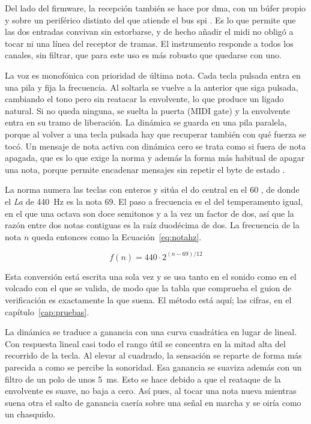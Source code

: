 Del lado del firmware, la recepción también se hace por \gls{dma}, con un búfer
propio y sobre un periférico distinto del que atiende el bus \gls{spi}
\cite{libDaisy}. Es lo que permite que las dos entradas convivan sin
estorbarse, y de hecho añadir el \gls{midi} no obligó a tocar ni una línea del
receptor de tramas. El instrumento responde a todos los canales, sin filtrar,
que para este uso es más robusto que quedarse con uno.

La voz es monofónica con prioridad de última nota. Cada tecla pulsada entra en
una pila y fija la frecuencia. Al soltarla se vuelve a la anterior que siga
pulsada, cambiando el tono pero sin reatacar la envolvente, lo que produce un
ligado natural. Si no queda ninguna, se suelta la puerta (MIDI gate) y la envolvente entra
en su tramo de liberación. La dinámica se guarda en una pila paralela, porque al
volver a una tecla pulsada hay que recuperar también con qué fuerza se tocó.
Un mensaje de nota activa con
dinámica cero se trata como si fuera de nota apagada, que es lo que exige la
norma y además la forma más habitual de apagar una nota, porque permite
encadenar mensajes sin repetir el byte de estado \cite{MIDI1}.

La norma numera las teclas con enteros y sitúa el do central en el 60
\cite{MIDI1}, de donde el \emph{La} de 440~Hz es la nota 69. El paso a
frecuencia es el del temperamento igual, en el que una octava son doce
semitonos y a la vez un factor de dos, así que la razón entre dos notas
contiguas es la raíz duodécima de dos. La frecuencia de la nota $n$ queda
entonces como la Ecuación~\eqref{eq:notahz}.

\begin{equation}
\label{eq:notahz}
f(n) = 440 \cdot 2^{(n-69)/12}
\end{equation}

Esta conversión está escrita una sola vez y se usa tanto en el sonido como en el
volcado con el que se valida, de modo que la tabla que comprueba el guion de
verificación es exactamente la que suena. El método está aquí; las cifras, en el
capítulo~\ref{cap:pruebas}.

La dinámica se traduce a ganancia con una curva cuadrática en lugar de lineal.
Con respuesta lineal casi todo el rango útil se concentra en la mitad alta del
recorrido de la tecla. Al elevar al cuadrado, la sensación se reparte de forma
más parecida a como se percibe la sonoridad.
Esa ganancia se suaviza además con un filtro de un polo de unos 5~ms.
Esto se hace debido a que el reataque de la envolvente es suave, no baja a cero. Así pues,
al tocar una nota nueva mientras suena otra el salto de ganancia caería sobre una señal en
marcha y se oiría como un chasquido.

